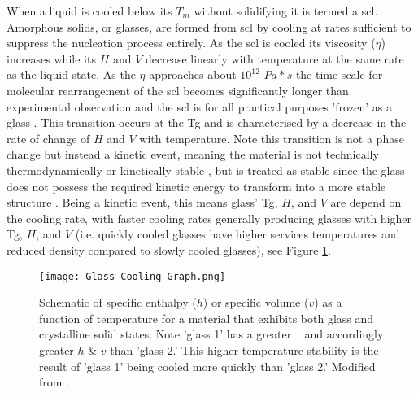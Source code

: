 \documentclass[a4paper,12pt,oneside]{report}%
\begin{document}
When a liquid is cooled below its $T_{m}$ without solidifying it is termed a \gls{scl}. Amorphous solids, or glasses, are formed from \gls{scl} by cooling at rates sufficient to suppress the nucleation process entirely. As the \gls{scl} is cooled its viscosity ($\eta$) increases while its $H$ and $V$ decrease linearly with temperature at the same rate as the liquid state. As the $\eta$ approaches about $10^{12}$ $Pa*s$ the time scale for molecular rearrangement of the \gls{scl} becomes significantly longer than experimental observation and the \gls{scl} is for all practical purposes 'frozen' as a glass \cite{Ediger1996, Ishii2014}. This transition occurs at the \gls{Tg} and is characterised by a decrease in the rate of change of $H$ and $V$ with temperature. Note this transition is not a phase change but instead a kinetic event, meaning the material is not technically thermodynamically or kinetically stable , but is treated as stable since the glass does not possess the required kinetic energy to transform into a more stable structure \cite{Ediger1996, Ishii2014}. Being a kinetic event, this means glass' \gls{Tg}, $H$, and $V$ are depend on the cooling rate, with faster cooling rates generally producing glasses with higher \gls{Tg}, $H$, and $V$ (i.e. quickly cooled glasses have higher services temperatures and reduced density compared to slowly cooled glasses), see Figure \ref{fig:GlassCooling}. 

\begin{figure}[htbp]
	\centering
	\texttt{[image: Glass\_Cooling\_Graph.png]}
	\caption[Schematic of specific enthalpy ($h$) or specific volume ($v$) as a function of temperature for a material that exhibits both glass and crystalline solid states. Note 'glass 1' has a greater \Tg~ and accordingly greater $h$ \& $v$ than 'glass 2.' This higher temperature stability is the result of 'glass 1' being cooled more quickly than 'glass 2.']{Schematic of specific enthalpy ($h$) or specific volume ($v$) as a function of temperature for a material that exhibits both glass and crystalline solid states. Note 'glass 1' has a greater \Tg~ and accordingly greater $h$ \& $v$ than 'glass 2.' This higher temperature stability is the result of 'glass 1' being cooled more quickly than 'glass 2.' Modified from \cite{Ediger1996}.}
	\label{fig:GlassCooling}
\end{figure}
\end{document}
